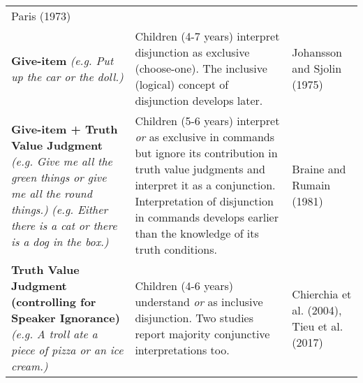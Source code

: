 \documentclass[
  english,
  ,man,floatsintext]{apa6}
\begin{document}
\begin{longtable}[]{@{}lll@{}}
\begin{minipage}[t]{0.17\columnwidth}
Paris (1973)\strut
\end{minipage}\tabularnewline
\begin{minipage}[t]{0.35\columnwidth}\raggedright
\textbf{Give-item} \newline \textit{(e.g. Put up the car or the doll.)}\strut
\end{minipage} & \begin{minipage}[t]{0.40\columnwidth}\raggedright
Children (4-7 years) interpret disjunction as exclusive (choose-one). The inclusive (logical) concept of disjunction develops later.\strut
\end{minipage} & \begin{minipage}[t]{0.17\columnwidth}\raggedright
Johansson and Sjolin (1975)\strut
\end{minipage}\tabularnewline
\begin{minipage}[t]{0.35\columnwidth}\raggedright
\textbf{Give-item + Truth Value Judgment} \newline \textit{(e.g. Give me all the green things or give me all the round things.)} \newline \textit{(e.g. Either there is a cat or there is a dog in the box.)}\strut
\end{minipage} & \begin{minipage}[t]{0.40\columnwidth}\raggedright
Children (5-6 years) interpret \emph{or} as exclusive in commands but ignore its contribution in truth value judgments and interpret it as a conjunction. Interpretation of disjunction in commands develops earlier than the knowledge of its truth conditions.\strut
\end{minipage} & \begin{minipage}[t]{0.17\columnwidth}\raggedright
Braine and Rumain (1981)\strut
\end{minipage}\tabularnewline
\begin{minipage}[t]{0.35\columnwidth}\raggedright
\textbf{Truth Value Judgment (controlling for Speaker Ignorance)} \newline \textit{(e.g. A troll ate a piece of pizza or an ice cream.)}\strut
\end{minipage} & \begin{minipage}[t]{0.40\columnwidth}\raggedright
Children (4-6 years) understand \emph{or} as inclusive disjunction. Two studies report majority conjunctive interpretations too.\strut
\end{minipage} & \begin{minipage}[t]{0.17\columnwidth}\raggedright
Chierchia et al. (2004), Tieu et al. (2017)\strut

\end{minipage}
\end{longtable}
\end{document}

